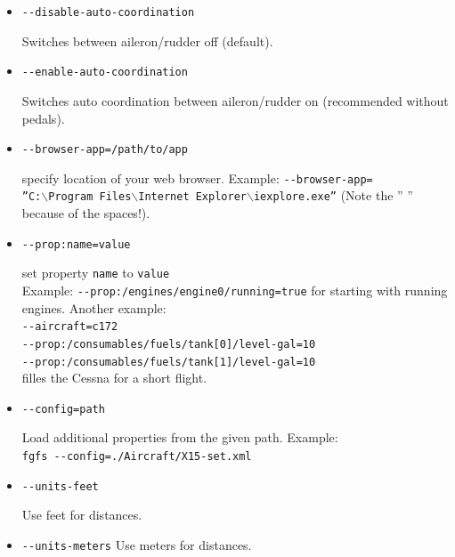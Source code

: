 \begin{itemize}
\item{\texttt{-$ $-disable-auto-coordination}}

  Switches  between aileron/rudder off (default).

\item{\texttt{-$ $-enable-auto-coordination}}

  Switches auto coordination between aileron/rudder on (recommended
  without pedals).

\item{\texttt{-$ $-browser-app=/path/to/app}}

  specify location of your web browser. Example:
  \texttt{-$ $-browser-app=}\\
  \texttt{''C:$\backslash$Program~Files$\backslash$Internet~Explorer$\backslash$iexplore.exe''}
  (Note the '' '' because of the spaces!).

\item{\texttt{-$ $-prop:name=value}}

  set property \texttt{name} to \texttt{value}\\Example:
\texttt{-$ $-prop:/engines/engine0/running=true} for starting with running engines. Another example:\\
\texttt{-$ $-aircraft=c172}\\
\texttt{-$ $-prop:/consumables/fuels/tank[0]/level-gal=10}\\
\texttt{-$ $-prop:/consumables/fuels/tank[1]/level-gal=10}\\
filles the Cessna for a short flight.

\item{\texttt{-$ $-config=path}}

  Load additional properties from the given path. Example:\\
  \texttt{fgfs -$ $-config=./Aircraft/X15-set.xml}

\item{\texttt{-$ $-units-feet}}

  Use feet for distances.

\item{\texttt{-$ $-units-meters}}
  Use meters for distances.
\end{itemize}
